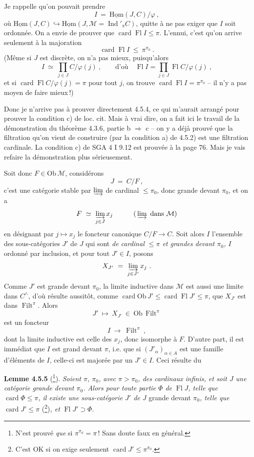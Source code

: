 \documentclass[11pt]{article}
\newcommand{\printedpage}[1]{\if\relax\detokenize{#1}\relax\else\marginpar{\footnotesize p.~#1}\fi}
\newcommand{\msp}[1]{\marginpar{\footnotesize [#1]}}
\newcommand{\uHom}{\underline{\mathrm{Hom}}}
\newcommand{\Ob}{\mathrm{Ob}\,}
\newcommand{\card}{\operatorname{card}}
\newcommand{\Fl}{\operatorname{Fl}}
\newcommand{\Filt}{\operatorname{Filt}}
\newcommand{\Ind}{\operatorname{Ind}}
\begin{document}
\msp{page 111}

Je rappelle qu'on pouvait prendre
\[
I \ =\ \uHom(J,C)/\varphi\ ,
\]
où $\uHom(J,C) \hookrightarrow \uHom(J, \mathcal{M} = \Ind'_{\pi}C)$, quitte à ne pas exiger que $I$ soit ordonnée. On a envie de prouver que $\card\Fl I \leqslant \pi$. L'ennui, c'est qu'on arrive seulement à la majoration
\[
\card\Fl I \ \leqslant\ \pi^{\pi_0}\ .
\]
(Même si $J$ est discrète, on n'a pas mieux, puisqu'alors
\[
I \ \simeq\ \prod_{j\in J} C/\varphi(j)\ , \qquad \text{d'où} \quad \Fl I = \prod_{j\in J} \Fl C/\varphi(j)\ ,
\]
et si $\card\Fl C/\varphi(j) = \pi$ pour tout $j$, on trouve $\card\Fl I = \pi^{\pi_0}$ -- il n'y a pas moyen de faire mieux\,!)

Donc je n'arrive pas à prouver directement 4.5.4, ce qui m'aurait arrangé pour prouver la condition c) de loc. cit. Mais à vrai dire, on a fait ici le travail de la démonstration du théorème 4.3.6, partie b $\Longrightarrow$ c -- on y a déjà prouvé que la filtration qu'on vient de construire (par la condition a) de 4.5.2) est une filtration cardinale. La condition c) de SGA 4 I 9.12 est prouvée à la page 76. Mais je vais refaire
\msp{page 112}
la démonstration plus sérieusement.

Soit donc $F \in \Ob\mathcal{M}$, considérons
\[
J \ =\ C/F\ ,
\]
c'est une catégorie stable par $\varinjlim$ de cardinal $\leqslant \pi_0$, donc grande devant $\pi_0$, et on a
\[
F \ \simeq\ \varinjlim_{j\in J} x_j \qquad\quad (\,\varinjlim \ \text{dans } \mathcal{M})
\]
\printedpage{32}
en désignant par $j \longmapsto x_j$ le foncteur canonique $C/F \longrightarrow C$. Soit alors $I$ l'ensemble des sous-catégories $J'$ de $J$ qui sont \textit{de cardinal $\leqslant \pi$ et grandes devant $\pi_0$, $I$} ordonné par inclusion, et pour tout $J' \in I$, posons
\[
X_{J'} \ =\ \varinjlim_{j\in J'} x_j\ .
\]
Comme $J'$ est grande devant $\pi_0$, la limite inductive dans $\mathcal{M}$ est aussi une limite dans $C^{\wedge}$, d'où résulte aussitôt, comme $\card\Ob J' \leqslant \card\Fl J' \leqslant \pi$, que $X_{J'}$ est dans $\Filt^{\pi}$. Alors
\[
J' \ \longmapsto\ X_{J'} \ \in\ \Ob\Filt^{\pi}
\]
est un foncteur
\[
I \ \longrightarrow\ \Filt^{\pi}\ ,
\]
dont la limite inductive est celle des $x_j$, donc isomorphe à $F$. D'autre part, il est immédiat que $I$ est grand devant $\pi$, i.e. que si $(J'_{\alpha})_{\alpha\in A}$ est
\msp{page 113}
une famille d'éléments de $I$, celle-ci est majorée par un $J' \in I$. Ceci résulte du

\textbf{Lemme 4.5.5} (\footnote{N'est prouvé \textit{que} si $\pi^{\pi_0} = \pi$\,! Sans doute faux en général.}). \textit{Soient $\pi$, $\pi_0$, avec $\pi > \pi_0$, des cardinaux infinis, et soit $J$ une catégorie grande devant $\pi_0$. Alors pour toute partie $\Phi$ de} $\Fl J$\textit{, telle que} $\card\Phi \leqslant \pi$\textit{, il existe une sous-catégorie $J'$ de $J$} grande devant $\pi_0$\textit{, telle que} $\card J' \leqslant \pi$ (\footnote{C'est OK si on exige seulement $\card J' \leqslant \pi^{\pi_0}$.})\textit{, et} $\Fl J' \supset \Phi$.
\end{document}
